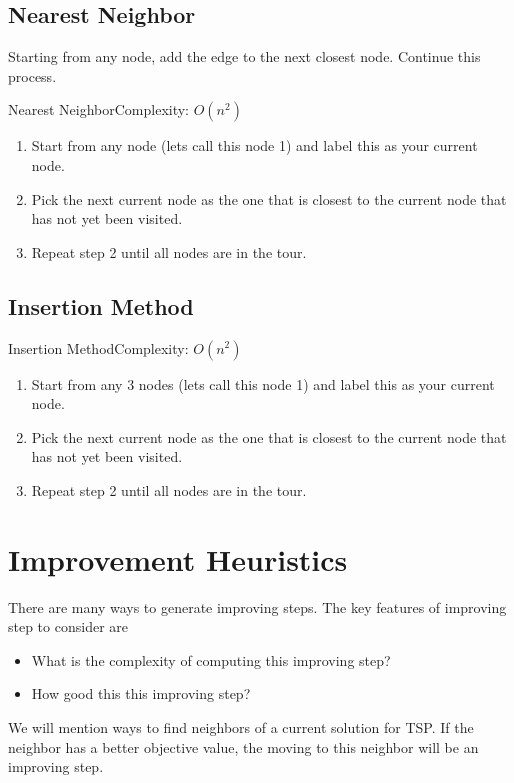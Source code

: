 \subsection{Nearest Neighbor}
Starting from any node, add the edge to the next closest node.  Continue this process.
\begin{general}{Nearest Neighbor}{Complexity: $O(n^2)$}
\label{heuristic:nearestNeighbor}
\begin{enumerate}
\item Start from any node (lets call this node 1) and label this as your current node.
\item Pick the next current node as the one that is closest to the current node that has not yet been visited.
\item Repeat step 2 until all nodes are in the tour.
\end{enumerate}
\end{general}

\subsection{Insertion Method }
\begin{general}{Insertion Method}{Complexity: $O(n^2)$}
\label{heuristic:insertion}
\begin{enumerate}
\item Start from any 3 nodes (lets call this node 1) and label this as your current node.
\item Pick the next current node as the one that is closest to the current node that has not yet been visited.
\item Repeat step 2 until all nodes are in the tour.
\end{enumerate}
\end{general}


\section{Improvement Heuristics}
There are many ways to generate improving steps.  The key features of improving step to consider are
\begin{itemize}
\item What is the complexity of  computing this improving step?
\item How good this this improving step?
\end{itemize}

We will mention ways to find neighbors of a current solution for TSP.  If the neighbor has a better objective value, the moving to this neighbor will be an improving step. 


